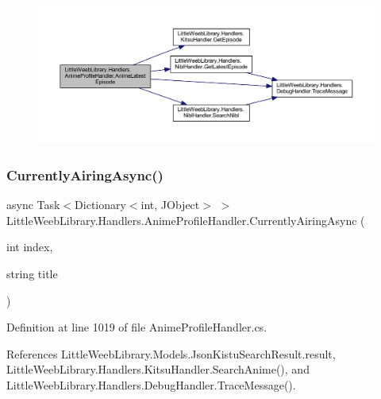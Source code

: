 \begin{figure}[H]
\begin{center}
\leavevmode
\includegraphics[width=350pt]{class_little_weeb_library_1_1_handlers_1_1_anime_profile_handler_a2f28ad03d4dfe8d90c0392da8af39651_cgraph}
\end{center}
\end{figure}
\mbox{\label{class_little_weeb_library_1_1_handlers_1_1_anime_profile_handler_a11b3560a1e2fe0e3ac5d481efb46d7a6}} 
\subsubsection{\texorpdfstring{Currently\+Airing\+Async()}{CurrentlyAiringAsync()}}
{\footnotesize\ttfamily async Task$<$Dictionary$<$int, J\+Object$>$ $>$ Little\+Weeb\+Library.\+Handlers.\+Anime\+Profile\+Handler.\+Currently\+Airing\+Async (\begin{DoxyParamCaption}\item[{int}]{index,  }\item[{string}]{title }\end{DoxyParamCaption})\hspace{0.3cm}{\ttfamily [private]}}



Definition at line 1019 of file Anime\+Profile\+Handler.\+cs.



References Little\+Weeb\+Library.\+Models.\+Json\+Kistu\+Search\+Result.\+result, Little\+Weeb\+Library.\+Handlers.\+Kitsu\+Handler.\+Search\+Anime(), and Little\+Weeb\+Library.\+Handlers.\+Debug\+Handler.\+Trace\+Message().


